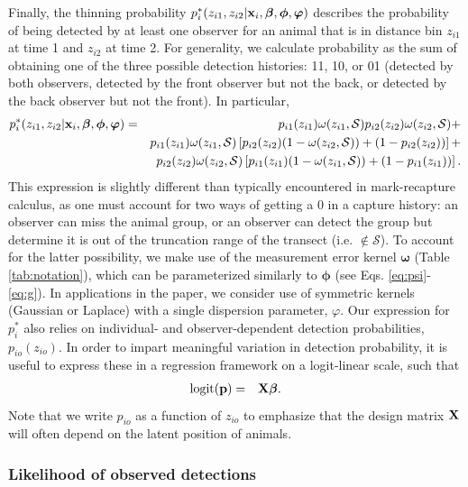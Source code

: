 \documentclass[12pt,fleqn]{article}
\begin{document}
Finally, the thinning probability
$p_i^*(z_{i1},z_{i2}|{\bf x}_i,\boldsymbol{\beta},\boldsymbol{\phi},\boldsymbol{\varphi})$ describes the probability of being detected by at least one observer for an animal that is in distance bin $z_{i1}$ at time 1 and $z_{i2}$ at time 2. For generality, we calculate probability as the sum of obtaining one of the three possible detection histories: 11, 10, or 01 (detected by both observers, detected by the front observer but not the back, or detected by the back observer but not the front).  In particular,
\begin{eqnarray*}
  p_i^*(z_{i1},z_{i2}|{\bf x}_i,\boldsymbol{\beta},\boldsymbol{\phi},\boldsymbol{\varphi}) & = &
  p_{i1}(z_{i1}) \omega(z_{i1},\mathcal{S}) p_{i2}(z_{i2})
  \omega(z_{i2},\mathcal{S}) + \\
   & & p_{i1}(z_{i1})\omega(z_{i1},\mathcal{S}) \left[
   p_{i2}(z_{i2})(1-\omega(z_{i2},\mathcal{S}))+(1-p_{i2}(z_{i2})) \right] + \\
   & & p_{i2}(z_{i2})\omega(z_{i2},\mathcal{S}) \left[
   p_{i1}(z_{i1})(1-\omega(z_{i1},\mathcal{S}))+(1-p_{i1}(z_{i1})) \right].
\end{eqnarray*}
This expression is slightly different than typically encountered in mark-recapture calculus, as one must account for two ways of getting a 0 in a capture history: an observer can miss the animal group, or an observer can detect the group but determine it is out of the truncation range of the transect (i.e. $\notin \mathcal{S}$).  To account for the latter possibility, we make use of the measurement error kernel $\boldsymbol{\omega}$ (Table \ref{tab:notation}), which can be parameterized similarly to $\boldsymbol{\phi}$ (see Eqs. \ref{eq:psi}-\ref{eq:g}).  In applications in the paper, we consider use of symmetric kernels (Gaussian or Laplace) with a single dispersion parameter, $\varphi$.  Our expression for $p_i^*$ also relies on individual- and observer-dependent detection probabilities, $p_{io}(z_{io})$.  In order to impart meaningful variation in detection probability, it is useful to express these in a regression framework on a logit-linear scale, such that
\begin{eqnarray}
  \textrm{logit}({\bf p}) & = & {\bf X} \boldsymbol{\beta}.
\end{eqnarray}
Note that we write $p_{io}$ as a function of $z_{io}$ to emphasize that the design matrix ${\bf X}$ will often depend on the latent position of animals.

\subsubsection{Likelihood of observed detections}
\end{document}
